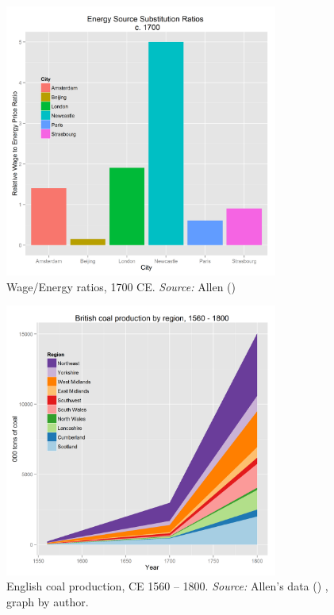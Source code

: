 \documentclass[12pt]{article}
\numberwithin{equation}{section}
\begin{document}
		\begin{figure}[htb]
		\centering
		\includegraphics[width=0.8\textwidth]{wage-energy.png}
		\caption{Wage/Energy ratios, 1700 CE. \textit{Source:} Allen (\citeyear{allen_british_2009})}
		\label{fig:allen_ratios}
		\end{figure}
		
		\begin{figure}[htb]
		\centering
		\includegraphics[width=0.8\textwidth]{allen_coal.png}
		\caption{English coal production, CE 1560 -- 1800. \textit{Source:} Allen's data (\citeyear{allen_british_2009}) , graph by author.}
		\label{fig:allen_coal}
		\end{figure}
\end{document}
